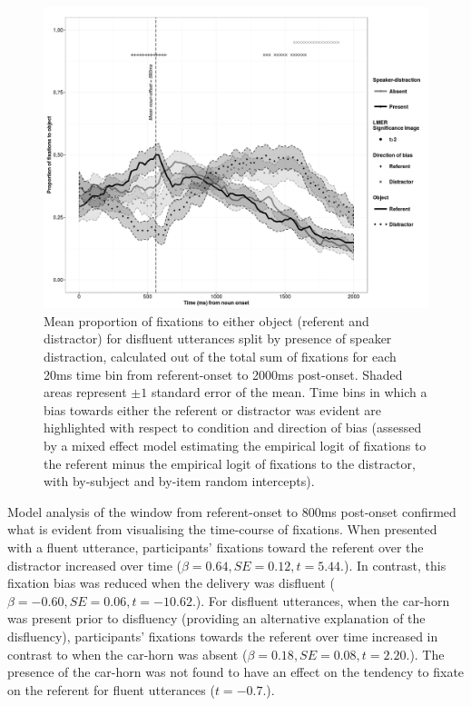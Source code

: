 \documentclass[a4paper,man,natbib]{apa6}
\begin{document}
\begin{figure}[Ht] %
  \centering
	\includegraphics[scale=.5]{disfluent.png}
  \caption{Mean proportion of fixations to either object (referent and distractor) for disfluent utterances split by presence of speaker distraction, calculated out of the total sum of fixations for each 20ms time bin from referent-onset to 2000ms post-onset. Shaded areas represent $\pm 1$ standard error of the mean. Time bins in which a bias towards either the referent or distractor was evident are highlighted with respect to condition and direction of bias (assessed by a mixed effect model estimating the empirical logit of fixations to the referent minus the empirical logit of fixations to the distractor, with by-subject and by-item random intercepts).}
  \label{fig:diseye}
\end{figure}


Model analysis of the window from referent-onset to 800ms post-onset confirmed what is evident from visualising the time-course of fixations. 
When presented with a fluent utterance, participants' fixations toward the referent over the distractor increased over time ($\beta = 0.64, SE = 0.12, t=5.44.$). 
In contrast, this fixation bias was reduced when the delivery was disfluent ($\beta = -0.60, SE = 0.06, t=-10.62.$). 
For disfluent utterances, when the car-horn was present prior to disfluency (providing an alternative explanation of the disfluency), participants' fixations towards the referent over time increased in contrast to when the car-horn was absent ($\beta = 0.18, SE = 0.08, t=2.20.$). 
The presence of the car-horn was not found to have an effect on the tendency to fixate on the referent for fluent utterances ($t=-0.7.$).\\
\end{document}
